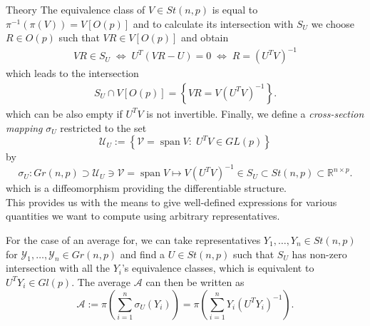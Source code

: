 \begin{chapter}{Theory}
The equivalence class of $V\in St(n,p)$ is equal to $\pi^{-1}(\pi(V))=V[O(p)]$ and to calculate its intersection with $S_U$ we choose $R\in O(p)$ such that
$VR\in V[O(p)]$ and obtain
\begin{align}
    VR\in S_U\;\Leftrightarrow\; U^T(VR-U)=0 \;\Leftrightarrow\; R = (U^TV)^{-1}
\end{align}
which leads to the intersection
\begin{align}
    S_U \cap V[O(p)] = \left\lbrace VR = V(U^{T}V)^{-1} \right\rbrace .
\end{align}
which can be also empty if $U^{T}V$ is not invertible. Finally, we define a \emph{cross-section mapping} $\sigma_U$ restricted to the set
\begin{equation}
    \mathcal{U}_U := \left\lbrace\mathcal{V}=\operatorname{span}V:\; U^TV\in GL(p) \right\rbrace
\end{equation}
by 
\begin{equation}
    \sigma_U: Gr(n,p)\supset \mathcal{U}_U\ni\mathcal{V}=\operatorname{span}V\mapsto V(U^{T}V)^{-1} \in S_U \subset St(n,p)\subset \mathbb{R}^{n\times p}.
\end{equation}
which is a diffeomorphism providing the differentiable structure.\\

This provides us with the means to give well-defined expressions for various quantities we want to compute using arbitrary representatives.
\begin{example}[Average]
For the case of an average for, we can take representatives $Y_1,\ldots,Y_n\in St(n,p)$ for $\mathcal{Y}_1,\ldots,\mathcal{Y}_n\in Gr(n,p)$
and find a $U\in St(n,p)$ such that $S_U$ has non-zero intersection with all the $Y_i$'s equivalence classes, which is equivalent
to $U^TY_i\in Gl(p)$. The average $\mathcal{A}$ can then be written as
\begin{equation}
    \mathcal{A} := \pi\left(\sum_{i=1}^{n}\sigma_U(Y_i)\right)=\pi\left(\sum_{i=1}^{n}Y_i(U^{T}Y_i)^{-1}\right).
\end{equation}
\end{example}




\end{chapter}
